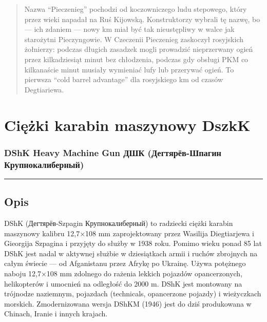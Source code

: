 \documentclass[12pt,openany,oneside]{book}
\begin{document}
\begin{quote}
Nazwa ``Pieczenieg'' pochodzi od koczowniczego ludu stepowego, który
przez wieki napadał na Ruś Kijowską. Konstruktorzy wybrali tę nazwę, bo
--- ich zdaniem --- nowy km miał być tak nieustępliwy w walce jak
starożytni Pieczyngowie. W Czeczenii Pieczenieg zaskoczył rosyjskich
żołnierzy: podczas długich zasadzek mogli prowadzić nieprzerwany ogień
przez kilkadziesiąt minut bez chłodzenia, podczas gdy obsługi PKM co
kilkanaście minut musiały wymieniać lufy lub przerywać ogień. To
pierwsza ``cold barrel advantage'' dla rosyjskiego km od czasów
Degtiariewa.
\end{quote}

\chapter{Ciężki karabin maszynowy
DszkK}\label{ciux119ux17cki-karabin-maszynowy-dszkk}

\subsection{DShK Heavy Machine Gun \textbar{} ДШК (Дегтярёв-Шпагин
Крупнокалиберный)}\label{dshk-heavy-machine-gun-ux434ux448ux43a-ux434ux435ux433ux442ux44fux440ux451ux432-ux448ux43fux430ux433ux438ux43d-ux43aux440ux443ux43fux43dux43eux43aux430ux43bux438ux431ux435ux440ux43dux44bux439}

\begin{center}\rule{0.5\linewidth}{0.5pt}\end{center}

\section{Opis}\label{opis-58}

DShK (Дегтярёв-Szpagin Крупнокалиберный) to radziecki ciężki karabin
maszynowy kalibru 12,7×108 mm zaprojektowany przez Wasilija Diegtiarjewa
i Gieorgija Szpagina i przyjęty do służby w 1938 roku. Pomimo wieku
ponad 85 lat DShK jest nadal w aktywnej służbie w dziesiątkach armii i
ruchów zbrojnych na całym świecie --- od Afganistanu przez Afrykę po
Ukrainę. Używa potężnego naboju 12,7×108 mm zdolnego do rażenia lekkich
pojazdów opancerzonych, helikopterów i umocnień na odległość do 2000 m.
DShK jest montowany na trójnodze naziemnym, pojazdach (technicals,
opancerzone pojazdy) i wieżyczkach morskich. Zmodernizowana wersja DShKM
(1946) jest do dziś produkowana w Chinach, Iranie i innych krajach.
\end{document}
